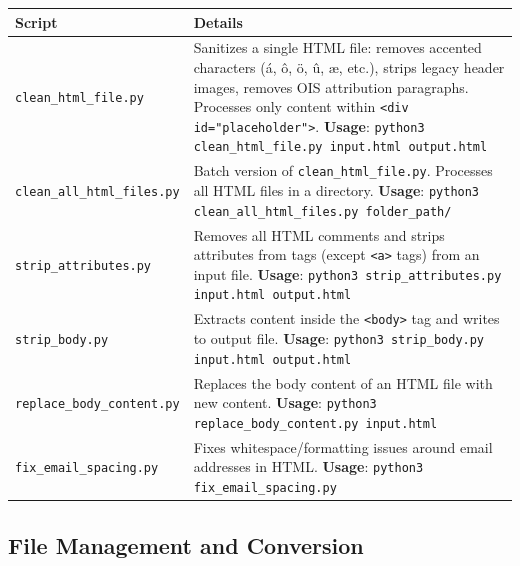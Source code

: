 \documentclass[12pt]{article}
\begin{document}
{\footnotesize
\begin{longtable}{p{4.5cm}p{8cm}}
\toprule
\textbf{Script} & \textbf{Details} \\
\midrule
\texttt{clean\_html\_file.py} &
    Sanitizes a single HTML file: removes accented characters
    (\'{a}, \^{o}, \"{o}, \^{u}, \ae, etc.), strips legacy header images,
    removes OIS attribution paragraphs. Processes only content within
    \texttt{<div id="placeholder">}.
    \newline\textbf{Usage}: \texttt{python3 clean\_html\_file.py input.html output.html} \\
\midrule
\texttt{clean\_all\_html\_files.py} &
    Batch version of \texttt{clean\_html\_file.py}. Processes all HTML files in a directory.
    \newline\textbf{Usage}: \texttt{python3 clean\_all\_html\_files.py folder\_path/} \\
\midrule
\texttt{strip\_attributes.py} &
    Removes all HTML comments and strips attributes from tags
    (except \texttt{<a>} tags) from an input file.
    \newline\textbf{Usage}: \texttt{python3 strip\_attributes.py input.html output.html} \\
\midrule
\texttt{strip\_body.py} &
    Extracts content inside the \texttt{<body>} tag and writes to output file.
    \newline\textbf{Usage}: \texttt{python3 strip\_body.py input.html output.html} \\
\midrule
\texttt{replace\_body\_content.py} &
    Replaces the body content of an HTML file with new content.
    \newline\textbf{Usage}: \texttt{python3 replace\_body\_content.py input.html} \\
\midrule
\texttt{fix\_email\_spacing.py} &
    Fixes whitespace/formatting issues around email addresses in HTML.
    \newline\textbf{Usage}: \texttt{python3 fix\_email\_spacing.py} \\
\bottomrule
\end{longtable}
}

\subsection{File Management and Conversion}
\end{document}
